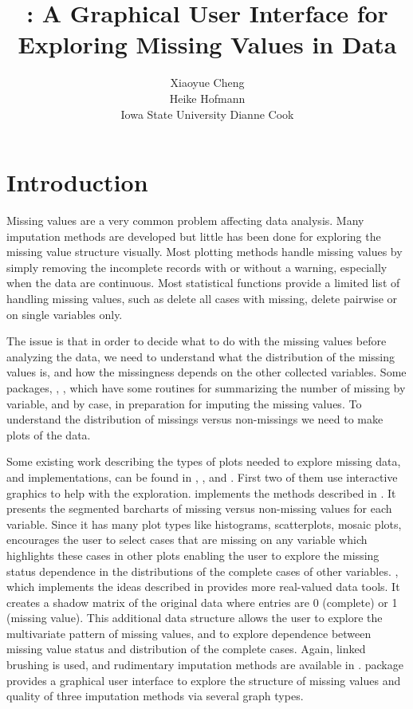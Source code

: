 \documentclass[article]{jss}
\author{Xiaoyue Cheng\\ \And 
        Heike Hofmann\\Iowa State University \And
        Dianne Cook\\}
\title{\pkg{MissingDataGUI}: A Graphical User Interface for Exploring 
	Missing Values in Data}
\begin{document}
\section{Introduction}

Missing values are a very common problem affecting data analysis. Many imputation methods are developed but little has been done for exploring the missing value structure visually.  Most plotting methods handle missing values by simply removing the incomplete records with or without a warning, especially when the data are continuous. Most statistical functions provide a limited list of handling missing values, such as delete all cases with missing, delete pairwise or on single variables only.

The issue is that in order to decide what to do with the missing values before analyzing the data, we need to understand what the distribution of the missing values is, and how the missingness depends on the other collected variables. Some  packages,  \citep{norm},  \citep{hmisc}, which have some routines for summarizing the number of missing by variable, and by case, in preparation for imputing the missing values. To understand the distribution of missings versus non-missings we need to make plots of the data.

Some existing work describing the types of plots needed to explore missing data, and implementations, can be found in \citet{unwin1996interactive}, \citet{swayne1998missing}, and \citet{templ2008visualization}. First two of them use interactive graphics to help with the exploration.  implements the methods described in \citet{unwin1996interactive}. It presents the segmented barcharts of missing versus non-missing values for each variable. Since it has many plot types like histograms, scatterplots, mosaic plots,  encourages the user to select cases that are missing on any variable which highlights these cases in other plots enabling the user to explore the missing status dependence in the distributions of the complete cases of other variables.  , which implements the ideas described in \citet{swayne1998missing} provides more real-valued data tools. It creates a shadow matrix of the original data where entries are 0 (complete) or 1 (missing value). This additional data structure allows the user to explore the multivariate pattern of missing values, and to explore dependence between missing value status and distribution of the complete cases. Again, linked brushing is used, and rudimentary imputation methods are available in  \citep{STLBC03}.  package  \citep{VIM} provides a graphical user interface to explore the structure of missing values and quality of three imputation methods via several graph types.
\end{document}
